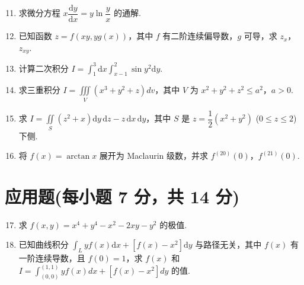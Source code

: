 \documentclass[../Main.tex]{subfiles}
\begin{document}
\begin{enumerate}
    \setcounter{enumi}{10}
    \item 求微分方程 \( x \dfrac{\mathrm{d}y}{\mathrm{d}x} = y \ln \dfrac{y}{x} \) 的通解.
          \vspace{10em}

    \item 已知函数 \( z = f(xy, yg(x)) \)，其中 \( f \) 有二阶连续偏导数，\( g \) 可导，求 \( z_x \)，\( z_{xy} \).
          \vspace{10em}

    \item 计算二次积分 \( I = \displaystyle \int_1^3 \mathrm{d}x \displaystyle \int_{x-1}^2 \sin y^2 \mathrm{d}y \).
          \vspace{12em}

    \item 求三重积分 \( I = \displaystyle \iiint \limits_V (x^3 + y^2 + z) dv \)，其中 \( V \) 为 \( x^2 + y^2 + z^2 \leq a^2 \)，\( a > 0 \).
          \vspace{12em}

    \item 求 \( I = \displaystyle \iint \limits_S (z^2 + x) \mathrm{d}y\,\mathrm{d}z - z\,\mathrm{d}x\,\mathrm{d}y \)，其中 \( S \) 是 \( z = \dfrac{1}{2}(x^2 + y^2) \) (\( 0 \leq z \leq 2 \)) 下侧.
          \vspace{12em}

    \item 将 \( f(x) = \arctan x \) 展开为 Maclaurin 级数，并求 \( f^{(20)}(0) \)，\( f^{(21)}(0) \).
          \vspace{12em}
\end{enumerate}

\section{应用题(每小题 7 分，共 14 分)}

\begin{enumerate}
    \setcounter{enumi}{16}
    \item 求 \( f(x, y) = x^4 + y^4 - x^2 - 2xy - y^2 \) 的极值.
          \vspace{10em}

    \item 已知曲线积分 \( \displaystyle \int_L y f(x) \mathrm{d}x + [f(x) - x^2] \mathrm{d}y \) 与路径无关，其中 \( f(x) \) 有一阶连续导数，且 \( f(0) = 1 \)，求 \( f(x) \) 和 \( I = \displaystyle \int_{(0,0)}^{(1,1)} y f(x) dx + [f(x) - x^2] dy \) 的值.
          \vspace{10em}
\end{enumerate}
\end{document}
